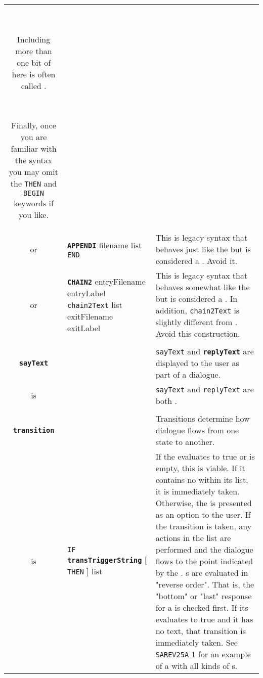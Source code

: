 \documentclass{article}
\def\ttref#1{\ahrefloc{#1}{\tt #1}}
\def\DEFINE#1{{\tt \bf #1}\label{#1}\index{#1}}
\def\t#1{{\tt #1}}
\def\Slist{{\color{red} list }}
\def\Ob{{\color{red} [ }}
\def\Oe{{\color{red} ] }}
\begin{document}
\begin{tabular}{cp{10in}|p{10in}}
  \ 

  Including more than one bit of \ttref{sayText} here is often called
  \ttref{Multisay}. 

  \ 

  Finally, once you are familiar with the syntax you may omit the \t{THEN}
  and \t{BEGIN} keywords if you like. 
  \\

or & \DEFINE{APPENDI} filename \ttref{state} \Slist \t{END} &
  This is legacy syntax that behaves just like the \ttref{D Action}
  \ttref{APPEND} but is considered a \ttref{state}. Avoid it. \\

or & \DEFINE{CHAIN2} entryFilename entryLabel 
  \t{chain2Text} \Slist exitFilename exitLabel & 
  This is legacy syntax that behaves somewhat like the \ttref{D Action}
  \ttref{CHAIN} but is considered a \ttref{state}. In addition, 
  \t{chain2Text} is slightly different from \ttref{chainText}. Avoid
  this construction. \\

\\

\DEFINE{sayText} & & \t{sayText} and \DEFINE{replyText} are displayed to
the user as part of a dialogue. \\ 
is & \ttref{text} & \t{sayText} and \t{replyText} are both \ttref{text}. \\

\\ 

\DEFINE{transition} & & Transitions determine how dialogue flows from one
state to another. \\

is & \t{IF} \DEFINE{transTriggerString} \Ob \t{THEN} \Oe
      \ttref{transFeature} \Slist \ttref{transNext} &
    If the \ttref{transTriggerString} evaluates to true or is empty, this
    \ttref{transition} is viable. If it contains no \ttref{replyText}
    within its \ttref{transFeature} list, it is immediately taken.
    Otherwise, the \ttref{replyText} is presented as an option to the user. 
    If the transition is taken, any actions in the \ttref{transFeature}
    list are performed and the dialogue flows to the point indicated by the
    \ttref{transNext}. 
  \ttref{transition}s are evaluated in "reverse order". That is, the "bottom"
  or "last" response for a \ttref{state} is checked first. If its
  \ttref{transTriggerString}
  evaluates to true and it has no \ttref{REPLY} text, that transition is
  immediately taken. See \t{SAREV25A} \ttref{state} 1 for an example of a
  \ttref{state} with all kinds of \ttref{transition}s. \\


\end{tabular}
\end{document}
